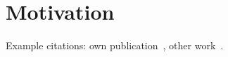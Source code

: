 \section{Motivation}\label{sec:intro_motivation}
 Example citations: own publication~\cite{placeholderP1}, other work~\cite{placeholderRef}.
